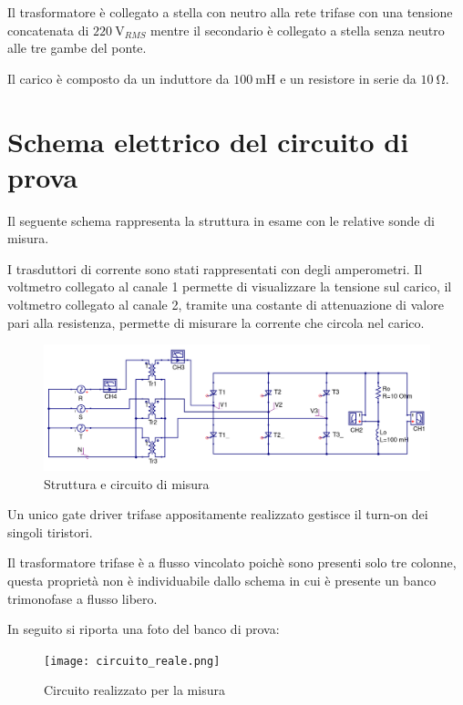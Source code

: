 \documentclass[a4paper,10pt]{article}
\begin{document}
Il trasformatore è collegato a stella con neutro alla rete trifase con una tensione
concatenata di $\SI{220}{\volt_{RMS}}$ mentre il secondario è collegato a stella 
senza neutro alle tre gambe del ponte.

Il carico è composto da un induttore da $\SI{100}{\milli\henry}$ e
un resistore in serie da $\SI{10}{\ohm}$.

\section{Schema elettrico del circuito di prova}
Il seguente schema rappresenta la struttura in esame con le relative sonde
di misura.

I trasduttori di corrente sono stati rappresentati con degli
amperometri. Il voltmetro collegato al canale 1 permette di visualizzare la 
tensione sul carico, il voltmetro collegato al canale 2, tramite una costante di 
attenuazione di valore pari alla resistenza, permette di misurare 
la corrente che circola nel carico.

\begin{figure}[H]
 \centering
 \includegraphics[keepaspectratio=true,width=1\linewidth]{circuito_qucs.png}
 \caption{Struttura e circuito di misura}
 \label{fig:circuito}
\end{figure}

Un unico gate driver trifase appositamente realizzato gestisce il turn-on
dei singoli tiristori.

Il trasformatore trifase è a flusso vincolato poichè sono presenti 
solo tre colonne, questa proprietà non è individuabile dallo schema in cui 
è presente un banco trimonofase a flusso libero.

In seguito si riporta una foto del banco di prova:
\begin{figure}[H]
 \centering
 \texttt{[image: circuito\_reale.png]}
 \caption{Circuito realizzato per la misura}
 \label{fig:circuito_reale}
\end{figure}
\end{document}
